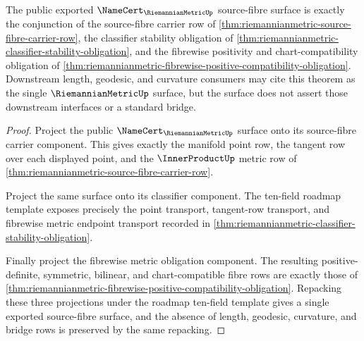 \begin{theorem}
\label{thm:riemannianmetric-public-source-fibre-namecert-surface}
The public exported $\NameCert_{\RiemannianMetricUp}$ source-fibre surface is
exactly the conjunction of the source-fibre carrier row of
\autoref{thm:riemannianmetric-source-fibre-carrier-row}, the classifier
stability obligation of
\autoref{thm:riemannianmetric-classifier-stability-obligation}, and the
fibrewise positivity and chart-compatibility obligation of
\autoref{thm:riemannianmetric-fibrewise-positive-compatibility-obligation}.
Downstream length, geodesic, and curvature consumers may cite this theorem as
the single $\RiemannianMetricUp$ surface, but the surface does not assert those
downstream interfaces or a standard bridge.
\end{theorem}
\begin{proof}
Project the public $\NameCert_{\RiemannianMetricUp}$ surface onto its
source-fibre carrier component. This gives exactly the manifold point row, the
tangent row over each displayed point, and the $\InnerProductUp$ metric row of
\autoref{thm:riemannianmetric-source-fibre-carrier-row}.

Project the same surface onto its classifier component. The ten-field roadmap
template exposes precisely the point transport, tangent-row transport, and
fibrewise metric endpoint transport recorded in
\autoref{thm:riemannianmetric-classifier-stability-obligation}.

Finally project the fibrewise metric obligation component. The resulting
positive-definite, symmetric, bilinear, and chart-compatible fibre rows are
exactly those of
\autoref{thm:riemannianmetric-fibrewise-positive-compatibility-obligation}.
Repacking these three projections under the roadmap ten-field template gives a
single exported source-fibre surface, and the absence of length, geodesic,
curvature, and bridge rows is preserved by the same repacking.
\end{proof}

